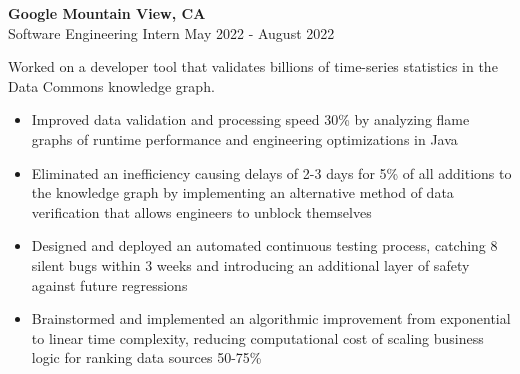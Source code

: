 \documentclass[letterpaper]{article}
\newcommand{\expheader}[4]{
    \vspace{2mm}
    \textbf{#1 \hfill #2}\\
    #3 \hfill #4\\
    \vspace{-2mm}
}
\begin{document}
\expheader{Google}{Mountain View, CA}{Software Engineering Intern}{May 2022 - August 2022}
\vspace{3mm}
    Worked on a developer tool that validates billions of time-series statistics in the Data Commons knowledge graph.
\begin{itemize} \itemsep 0pt

	\item Improved data validation and processing speed 30\% by analyzing flame graphs of runtime performance and engineering optimizations in Java 
    
    \item Eliminated an inefficiency causing delays of 2-3 days for 5\% of all additions to the knowledge graph by implementing an alternative method of data verification that allows engineers to unblock themselves
    
    \item Designed and deployed an automated continuous testing process, catching 8 silent bugs within 3 weeks and introducing an additional layer of safety against future regressions

    \item Brainstormed and implemented an algorithmic improvement from exponential to linear time complexity, reducing computational cost of scaling business logic for ranking data sources 50-75\%
    

\end{itemize}
\end{document}
